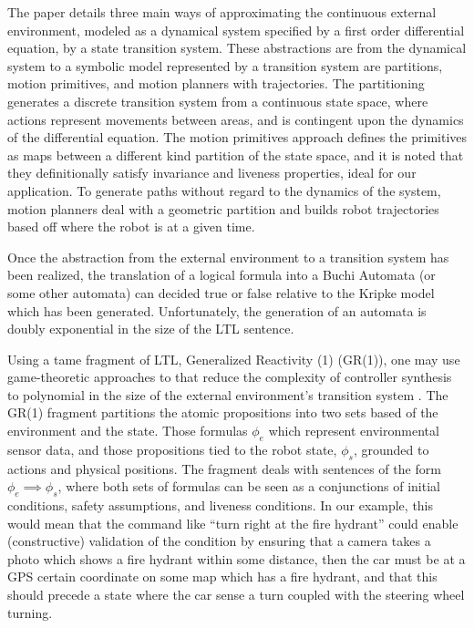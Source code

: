 \documentclass[a4paper, 11pt]{article}
\begin{document}
The paper details three main ways of approximating the continuous external
environment, modeled as a dynamical system specified by a first order
differential equation, by a state transition system. These abstractions are from
the dynamical system to a symbolic model represented by a transition system are
partitions, motion primitives, and motion planners with trajectories. The partitioning generates a
discrete transition system from a continuous state space, where actions
represent movements between areas, and is contingent upon the dynamics of the
differential equation. The motion primitives approach defines the primitives as
maps between a different kind partition of the state space, and it is noted that
they definitionally satisfy invariance and liveness properties, ideal for our application.
To generate paths without regard to the dynamics of the system, motion planners
deal with a geometric partition and builds robot trajectories based off where
the robot is at a given time.

Once the abstraction from the external environment to a transition system has
been realized, the translation of a logical formula into a Buchi Automata (or
some other automata) can decided true or false relative to the Kripke model
which has been generated. Unfortunately, the generation of an automata is doubly
exponential in the size of the LTL sentence.

Using a tame fragment of LTL, Generalized Reactivity (1) (GR(1)), one may use
game-theoretic approaches to that reduce the complexity of controller synthesis
to polynomial in the size of the external environment's transition system
\cite{BLOEM2012911}. The GR(1) fragment partitions the atomic propositions into
two sets based of the environment and the state. Those formulas $\phi_e$ which
represent environmental sensor data, and those propositions tied to the robot
state, $\phi_s$, grounded to actions and physical positions. The fragment deals
with sentences of the form $\phi_e \implies \phi_s$, where both sets of formulas
can be seen as a conjunctions of initial conditions, safety assumptions, and
liveness conditions. In our example, this would mean that the command like
``turn right at the fire hydrant'' could enable (constructive) validation of the
condition by ensuring that a camera takes a photo which shows a fire hydrant
within some distance, then the car must be at a GPS certain coordinate on some
map which has a fire hydrant, and that this should precede a state where the car
sense a turn coupled with the steering wheel turning.
\end{document}
